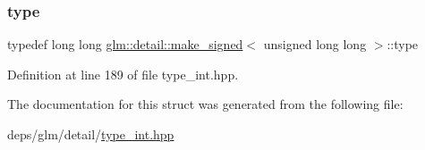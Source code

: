 \subsubsection{\texorpdfstring{type}{type}}
{\footnotesize\ttfamily typedef long long \hyperlink{structglm_1_1detail_1_1make__signed}{glm\+::detail\+::make\+\_\+signed}$<$ unsigned long long $>$\+::type}



Definition at line 189 of file type\+\_\+int.\+hpp.



The documentation for this struct was generated from the following file\+:\begin{DoxyCompactItemize}
\item 
deps/glm/detail/\hyperlink{type__int_8hpp}{type\+\_\+int.\+hpp}\end{DoxyCompactItemize}
